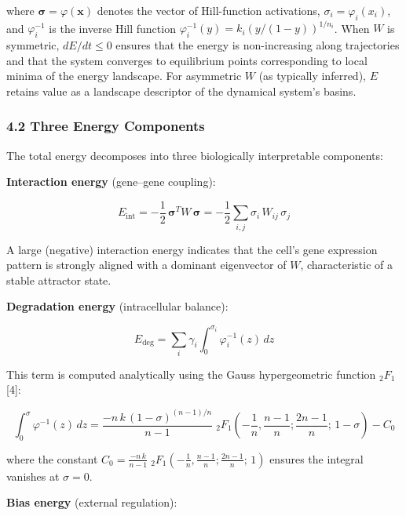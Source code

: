 \documentclass[11pt]{article}
\begin{document}
where $\boldsymbol{\sigma} = \varphi(\mathbf{x})$ denotes the vector of Hill-function activations, $\sigma_i = \varphi_i(x_i)$, and $\varphi_i^{-1}$ is the inverse Hill function $\varphi_i^{-1}(y) = k_i\left(y/(1-y)\right)^{1/n_i}$. When $W$ is symmetric, $dE/dt \leq 0$ ensures that the energy is non-increasing along trajectories and that the system converges to equilibrium points corresponding to local minima of the energy landscape. For asymmetric $W$ (as typically inferred), $E$ retains value as a landscape descriptor of the dynamical system's basins.


\subsubsection*{4.2 Three Energy Components}

The total energy decomposes into three biologically interpretable components:

\textbf{Interaction energy} (gene--gene coupling):

\begin{equation}
E_{\text{int}} = -\frac{1}{2}\,\boldsymbol{\sigma}^T W\,\boldsymbol{\sigma} = -\frac{1}{2}\sum_{i,j}\sigma_i\,W_{ij}\,\sigma_j 
\end{equation}


A large (negative) interaction energy indicates that the cell's gene expression pattern is strongly aligned with a dominant eigenvector of $W$, characteristic of a stable attractor state.

\textbf{Degradation energy} (intracellular balance):

\begin{equation}
E_{\text{deg}} = \sum_i \gamma_i \int_0^{\sigma_i} \varphi_i^{-1}(z)\,dz 
\end{equation}


This term is computed analytically using the Gauss hypergeometric function $_2F_1$ [4]:


\begin{equation}
\int_0^{\sigma} \varphi^{-1}(z)\,dz = \frac{-n\,k\,(1-\sigma)^{(n-1)/n}}{n-1}\;{}_2F_1\!\left(-\frac{1}{n},\frac{n-1}{n};\frac{2n-1}{n};\,1-\sigma\right) - C_0 
\end{equation}


where the constant $C_0 = \frac{-n\,k}{n-1}\;{}_2F_1\!\left(-\frac{1}{n},\frac{n-1}{n};\frac{2n-1}{n};\,1\right)$ ensures the integral vanishes at $\sigma = 0$.

\textbf{Bias energy} (external regulation):
\end{document}
